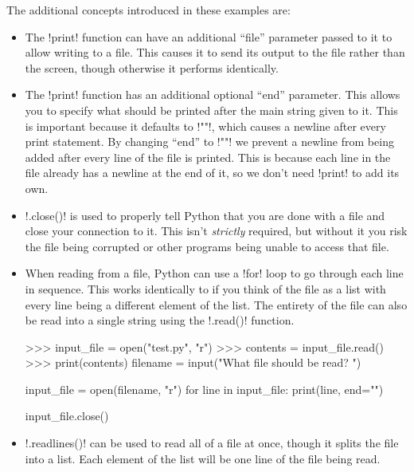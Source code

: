 \documentclass[11pt]{cselabheader}
\begin{document}
The additional concepts introduced in these examples are:

\begin{itemize}
\item The \pythoninline!print! function can have an additional ``file'' parameter
  passed to it to allow writing to a file. This causes it to send its output to
  the file rather than the screen, though otherwise it performs identically.

\item The \pythoninline!print! function has an additional optional ``end''
  parameter. This allows you to specify what should be printed after the main
  string given to it. This is important because it defaults to \pythoninline!"\n"!,
  which causes a newline after every print statement. By changing ``end'' to
  \pythoninline!""! we prevent a newline from being added after every line of the
  file is printed. This is because each line in the file already has a newline
  at the end of it, so we don't need \pythoninline!print! to add its own.

\item \pythoninline!.close()! is used to properly tell Python that you are done
  with a file and close your connection to it. This isn't \emph{strictly}
  required, but without it you risk the file being corrupted or other programs
  being unable to access that file.

\item When reading from a file, Python can use a \pythoninline!for! loop to go
  through each line in sequence. This works identically to if you think of the
  file as a list with every line being a different element of the list. The
  entirety of the file can also be read into a single string using the
  \pythoninline!.read()! function.

\begin{pyconcode}
>>> input_file = open("test.py", "r")
>>> contents = input_file.read()
>>> print(contents)
filename = input("What file should be read? ")

input_file = open(filename, "r")
for line in input_file:
    print(line, end="")

input_file.close()
\end{pyconcode}

\item \pythoninline!.readlines()! can be used to read all of a file at once, though
  it splits the file into a list. Each element of the list will be one line of
  the file being read.
\end{itemize}
\end{document}

